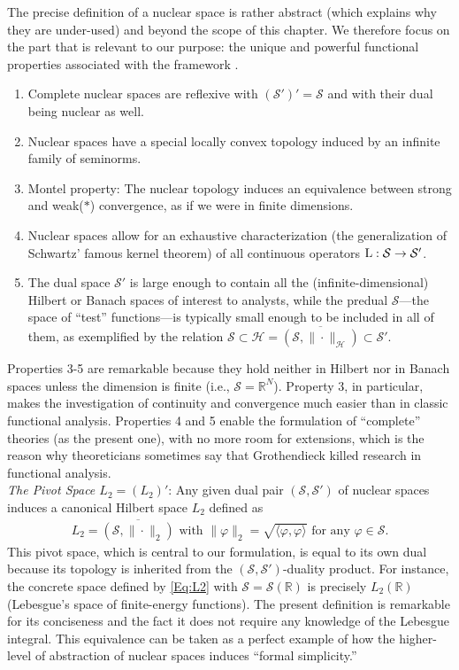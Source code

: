 \documentclass[11pt, english,english]{article}
\newcommand{\R}{ \mathbb{R}}
\newcommand{\Lop}{{\rm L}}
\def\Spc#1{{\mathcal{#1}}}  %
\renewcommand{\[}{\begin{equation}}
\renewcommand{\]}[1]{\label{eq:#1}\end{equation}}
\begin{document}
The precise definition of a nuclear space is rather abstract (which explains why they are under-used) and beyond the scope of this chapter. We therefore focus on the part that is relevant  to our purpose: the unique and powerful functional properties associated with the framework \cite{Horvath1966topological,Treves2006}.
\begin{enumerate}
\item Complete nuclear spaces are reflexive with $(\Spc S')'=\Spc S$ and with their dual being nuclear as well.
\item Nuclear spaces have a special locally convex topology induced by an infinite family of seminorms.
\item Montel property: The nuclear topology induces an equivalence between strong and weak($\ast$) convergence, as if we were in finite dimensions.
\item  Nuclear spaces allow for an exhaustive characterization (the generalization of Schwartz' famous kernel theorem) of all continuous operators $\Lop:  \Spc S \to \Spc S'$.
\item The dual space $\Spc S'$ is large enough to contain all the (infinite-dimensional) Hilbert or Banach spaces of interest to
analysts, while the predual $\Spc S$---the space of ``test'' functions---is typically small enough to be included in all of them, as exemplified by the  relation $\Spc S \subset \Spc H=\overline{(\Spc S,\|\cdot\|_{\Spc H})} \subset \Spc S'$.
\end{enumerate} 
Properties 3-5 are remarkable because they hold neither in Hilbert nor in Banach spaces unless the dimension is finite (i.e., $\Spc S=\R^N$).
Property 3, in particular, makes the investigation of continuity and convergence much easier than in classic functional analysis.
Properties 4 and 5 enable the formulation of ``complete'' theories (as the present one), with no more room for extensions, which is the reason why theoreticians sometimes say that Grothendieck killed research in functional analysis. \\[1ex]
%
{\em The Pivot Space $L_2=(L_2)'$}: Any given dual pair $(\Spc S,\Spc S')$
 of nuclear spaces induces a canonical Hilbert space $L_2$ defined as
\begin{align}
\label{Eq:L2}
L_2=\overline{(\Spc S,\|\cdot\|_2)}  \mbox{ with } \|\varphi\|_2=\sqrt{\langle\varphi,\varphi \rangle} \mbox{ for any } \varphi \in \Spc S.
\end{align} 
This pivot space, which is central to our formulation, is equal to its own dual because its topology is inherited from the $(\Spc S,\Spc S')$-duality product. For instance, the concrete space defined by \eqref{Eq:L2} with $\Spc S=\Spc S(\R)$ is precisely $L_2(\R)$ (Lebesgue's space of finite-energy functions). The present definition is remarkable for its conciseness and the fact it does not require any knowledge of the Lebesgue integral. This equivalence can be taken as a perfect example of how the higher-level of abstraction of nuclear spaces induces ``formal simplicity.''
\end{document}
